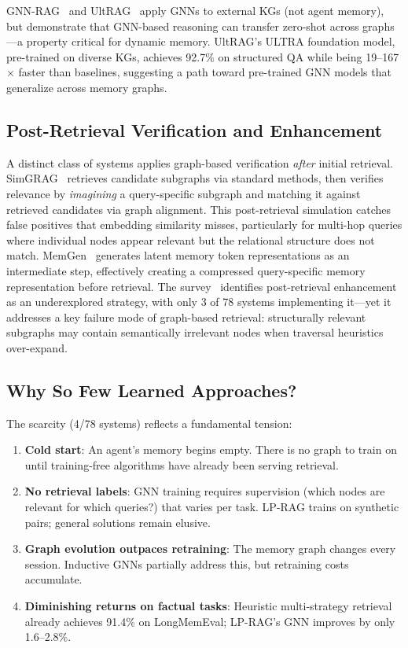 \documentclass[hf]{ceurart}
\begin{document}
GNN-RAG~\cite{gnnrag2025} and UltRAG~\cite{ultrag2026} apply
GNNs to external KGs (not agent memory), but demonstrate that GNN-based
reasoning can transfer zero-shot across graphs---a property critical
for dynamic memory. UltRAG's ULTRA foundation model, pre-trained on
diverse KGs, achieves 92.7\% on structured QA while being
19--167$\times$ faster than baselines, suggesting a path toward
pre-trained GNN models that generalize across memory graphs.

\subsection{Post-Retrieval Verification and Enhancement}
\label{sec:postretrieval}

A distinct class of systems applies graph-based verification
\emph{after} initial retrieval. SimGRAG~\cite{simgrag2025} retrieves
candidate subgraphs via standard methods, then verifies relevance by
\emph{imagining} a query-specific subgraph and matching it against
retrieved candidates via graph alignment. This post-retrieval
simulation catches false positives that embedding similarity misses,
particularly for multi-hop queries where individual nodes appear
relevant but the relational structure does not match.
MemGen~\cite{memgen2025} generates latent memory token representations
as an intermediate step, effectively creating a compressed
query-specific memory representation before retrieval.
The survey~\cite{graphmemsurvey2026} identifies post-retrieval
enhancement as an underexplored strategy, with only 3 of 78 systems
implementing it---yet it addresses a key failure mode of graph-based
retrieval: structurally relevant subgraphs may contain semantically
irrelevant nodes when traversal heuristics over-expand.

\subsection{Why So Few Learned Approaches?}

The scarcity (4/78 systems) reflects a fundamental tension:

\begin{enumerate}
\item \textbf{Cold start}: An agent's memory begins empty. There is no
  graph to train on until training-free algorithms have already been
  serving retrieval.
\item \textbf{No retrieval labels}: GNN training requires supervision
  (which nodes are relevant for which queries?) that varies per task.
  LP-RAG trains on synthetic pairs; general solutions remain elusive.
\item \textbf{Graph evolution outpaces retraining}: The memory graph
  changes every session. Inductive GNNs partially address this, but
  retraining costs accumulate.
\item \textbf{Diminishing returns on factual tasks}: Heuristic
  multi-strategy retrieval already achieves 91.4\% on LongMemEval;
  LP-RAG's GNN improves by only 1.6--2.8\%.
\end{enumerate}
\end{document}
